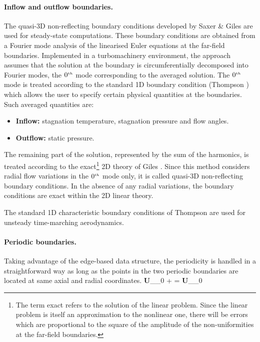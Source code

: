 \paragraph{Inflow and outflow boundaries.} 
%
 The quasi-3D non-reflecting boundary
 conditions developed by Saxer \& Giles \citeyear{Giles:7} are used
 for steady-state computations.
 These boundary conditions are obtained from a Fourier mode analysis
 of the linearised Euler equations at the far-field boundaries.
 Implemented in a turbomachinery environment, the approach assumes
 that the solution at the boundary is circumferentially decomposed into Fourier modes,
 the $0^{\mbox{\tiny $th$}}$ mode corresponding to the averaged solution.
 The $0^{\mbox{\tiny $th$}}$ mode is treated according to the standard 
 1D boundary condition (Thompson )
 which allows the user to specify certain physical quantities at the boundaries.
 Such averaged quantities are:
%
\begin{itemize}
 \item
  {\bf Inflow:} stagnation temperature, stagnation pressure and flow angles.
 \item
  {\bf Outflow:} static pressure.
\end{itemize}
%
 The remaining part of the solution, represented by the sum of the harmonics,
 is treated according to the exact\footnote{The term exact refers to the
 solution of the linear problem. Since the linear problem is itself an approximation
 to the nonlinear one, there will be errors which are proportional to the square
 of the amplitude of the non-uniformities at the far-field boundaries.}
 2D theory of Giles \citeyear{Giles:5,Giles:6}.
 Since this method considers radial flow variations in the $0^{\mbox{\tiny $th$}}$ mode only, it is
 called quasi-3D non-reflecting boundary conditions. In the absence of any radial
 variations, the boundary conditions are exact within
 the 2D linear theory.

 The  standard 1D characteristic boundary conditions of
 Thompson \citeyear{Thompson:1,Thompson:2} are used for 
 unsteady time-marching aerodynamics.
%
%
% 
\paragraph{Periodic boundaries.}
%
 Taking advantage of the edge-based data structure, the periodicity is handled in 
 a straightforward way as long as the points in the two periodic
 boundaries are located at same axial and radial coordinates.
%
\beq
  {\bf U}_{\theta_0 + \Delta \theta} = {\bf U}_{\theta_0}
\eeq
%
